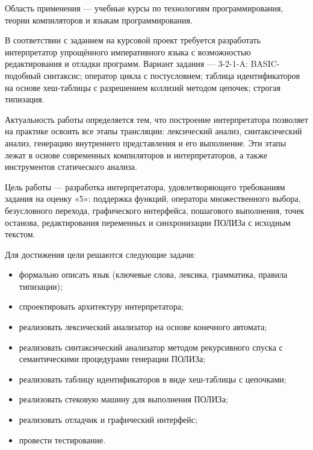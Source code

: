 \documentclass[14pt,a4paper]{article}
\begin{document}
Область применения — учебные курсы по технологиям программирования,
теории компиляторов и языкам программирования.


\tableofcontents


В соответствии с заданием на курсовой проект требуется разработать
интерпретатор упрощённого императивного языка с возможностью
редактирования и отладки программ. Вариант задания — 3-2-1-A:
BASIC-подобный синтаксис; оператор цикла с постусловием; таблица
идентификаторов на основе хеш-таблицы с разрешением коллизий
методом цепочек; строгая типизация.

Актуальность работы определяется тем, что построение интерпретатора
позволяет на практике освоить все этапы трансляции: лексический
анализ, синтаксический анализ, генерацию внутреннего представления
и его выполнение. Эти этапы лежат в основе современных компиляторов
и интерпретаторов, а также инструментов статического анализа.

Цель работы — разработка интерпретатора, удовлетворяющего
требованиям задания на оценку «5»: поддержка функций, оператора
множественного выбора, безусловного перехода, графического
интерфейса, пошагового выполнения, точек останова, редактирования
переменных и синхронизации ПОЛИЗа с исходным текстом.

Для достижения цели решаются следующие задачи:
\begin{itemize}
  \item формально описать язык (ключевые слова, лексика, грамматика,
        правила типизации);
  \item спроектировать архитектуру интерпретатора;
  \item реализовать лексический анализатор на основе конечного
        автомата;
  \item реализовать синтаксический анализатор методом рекурсивного
        спуска с семантическими процедурами генерации ПОЛИЗа;
  \item реализовать таблицу идентификаторов в виде хеш-таблицы
        с цепочками;
  \item реализовать стековую машину для выполнения ПОЛИЗа;
  \item реализовать отладчик и графический интерфейс;
  \item провести тестирование.
\end{itemize}
\end{document}
